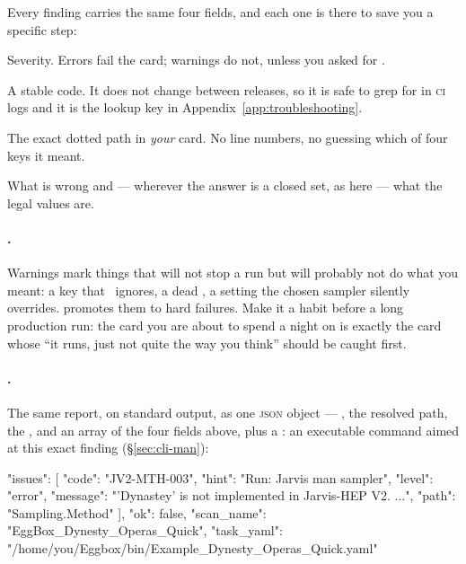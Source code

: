 Every finding carries the same four fields, and each one is there to save you a specific
step:

\begin{keylist}
  \item[{[error] / [warning]}] Severity. Errors fail the card; warnings do not, unless
        you asked for .
  \item[JV2-MTH-003] A stable code. It does not change between releases, so it is safe
        to grep for in \textsc{ci} logs and it is the lookup key in
        Appendix~\ref{app:troubleshooting}.
  \item[Sampling.Method] The exact dotted path in \emph{your} card. No line numbers, no
        guessing which of four  keys it meant.
  \item[the message] What is wrong and --- wherever the answer is a closed set, as here
        --- what the legal values are.
\end{keylist}

\paragraph{.} Warnings mark things that will not stop a run but will
probably not do what you meant: a key that \Jtwo\ ignores, a dead
, a setting the chosen sampler silently overrides.
 promotes them to hard failures. Make it a habit before a long production
run: the card you are about to spend a night on is exactly the card whose ``it runs,
just not quite the way you think'' should be caught first.

\paragraph{.} The same report, on standard output, as one \textsc{json}
object --- , the resolved  path, the , and an
 array of the four fields above, plus a : an executable
 command aimed at this exact finding (\S\ref{sec:cli-man}):

\begin{terminal}
\begin{jout}
{
  "issues": [
    {
      "code": "JV2-MTH-003",
      "hint": "Run: Jarvis man sampler",
      "level": "error",
      "message": "'Dynastey' is not implemented in Jarvis-HEP V2. ...",
      "path": "Sampling.Method"
    }
  ],
  "ok": false,
  "scan_name": "EggBox_Dynesty_Operas_Quick",
  "task_yaml": "/home/you/Eggbox/bin/Example_Dynesty_Operas_Quick.yaml"
}
\end{jout}
\end{terminal}

